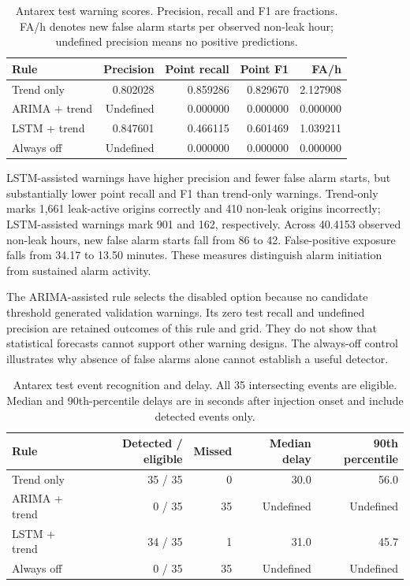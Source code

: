 \documentclass[10pt,a4paper,twocolumn]{article}
\begin{document}
\begin{table}[tbp]
\centering
\caption{Antarex test warning scores. Precision, recall and F1 are fractions. FA/h denotes new false alarm starts per observed non-leak hour; undefined precision means no positive predictions.}
\label{tab:7}
\fontsize{8.5}{10.2}\selectfont
\setlength{\tabcolsep}{2.4pt}
\renewcommand{\arraystretch}{1.17}
\begin{tabularx}{\linewidth}{@{}L{1.24}R{0.94}R{0.94}R{0.94}R{0.94}@{}}
\toprule
\textbf{Rule} & \textbf{Precision} & \textbf{Point recall} & \textbf{Point F1} & \textbf{FA/h} \\
\midrule
Trend only & 0.802028 & 0.859286 & 0.829670 & 2.127908 \\
ARIMA + trend & Undefined & 0.000000 & 0.000000 & 0.000000 \\
LSTM + trend & 0.847601 & 0.466115 & 0.601469 & 1.039211 \\
Always off & Undefined & 0.000000 & 0.000000 & 0.000000 \\
\bottomrule
\end{tabularx}
\end{table}

LSTM-assisted warnings have higher precision and fewer false alarm starts, but substantially lower point recall and F1 than trend-only warnings. Trend-only marks 1,661 leak-active origins correctly and 410 non-leak origins incorrectly; LSTM-assisted warnings mark 901 and 162, respectively. Across 40.4153 observed non-leak hours, new false alarm starts fall from 86 to 42. False-positive exposure falls from 34.17 to 13.50 minutes. These measures distinguish alarm initiation from sustained alarm activity.

The ARIMA-assisted rule selects the disabled option because no candidate threshold generated validation warnings. Its zero test recall and undefined precision are retained outcomes of this rule and grid. They do not show that statistical forecasts cannot support other warning designs. The always-off control illustrates why absence of false alarms alone cannot establish a useful detector.

\begin{table}[tbp]
\centering
\caption{Antarex test event recognition and delay. All 35 intersecting events are eligible. Median and 90th-percentile delays are in seconds after injection onset and include detected events only.}
\label{tab:8}
\fontsize{8.5}{10.2}\selectfont
\setlength{\tabcolsep}{2.4pt}
\renewcommand{\arraystretch}{1.17}
\begin{tabularx}{\linewidth}{@{}L{1.15}R{0.98}R{0.57}R{1.1}R{1.2}@{}}
\toprule
\textbf{Rule} & \textbf{Detected / eligible} & \textbf{Missed} & \textbf{Median delay} & \textbf{90th percentile} \\
\midrule
Trend only & 35 / 35 & 0 & 30.0 & 56.0 \\
ARIMA + trend & 0 / 35 & 35 & Undefined & Undefined \\
LSTM + trend & 34 / 35 & 1 & 31.0 & 45.7 \\
Always off & 0 / 35 & 35 & Undefined & Undefined \\
\bottomrule
\end{tabularx}
\end{table}
\end{document}
